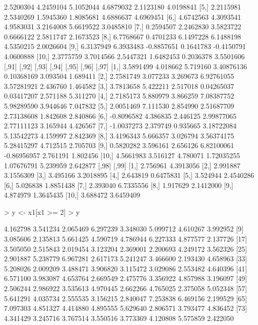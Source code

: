 \documentclass[12pt]{article}
\begin{document}
\begin{Schunk}
\begin{Soutput}
 [4,]  2.5200304 4.2459104  5.1052044 4.6879032  2.1123180  4.0198841
 [5,]  2.2115981 2.5340269  1.5945360 1.8085681  4.6886637  4.6969451
 [6,]  4.6742563 4.3093541  4.9583031 3.2164008  5.6619522  3.0485810
 [7,]  0.2594507 2.2462830  3.5823722 0.6666122  2.5811747  2.1673523
 [8,]  6.7768667 0.4701233  6.1497228 6.1488198  4.5350215  2.0026604
 [9,]  6.3137949 6.3933483 -0.8857651 0.1641783 -0.4150791  4.0600888
[10,]  2.3775759 3.7014566  2.5447321 1.6482453  0.2036378  3.5501606
           [,91]    [,92]    [,93]      [,94]       [,95]    [,96]    [,97]
 [1,]  3.5891499 4.018662 5.719160 3.40876136  0.10368169 3.093504 1.689411
 [2,]  2.7581749 3.077233 3.269673 6.92761055  3.57281921 2.436760 1.464582
 [3,]  3.7813658 5.422211 2.517018 0.04265037  0.03417207 2.571188 5.311270
 [4,]  2.7185173 5.880979 3.866259 7.08387752  5.98289590 3.944646 7.047832
 [5,]  2.0051469 7.111530 2.854990 2.51687709  2.73138608 1.842608 2.840866
 [6,] -0.8096582 4.386835 2.446125 2.99877065  2.77111123 3.165944 4.426567
 [7,] -1.0037273 2.379749 0.935665 3.18722084  5.13542273 4.159997 2.842369
 [8,]  3.4196343 5.666357 3.026794 3.56374175  5.28415297 4.712515 2.705703
 [9,]  0.5820282 3.596161 2.656126 6.82100061 -0.86956957 2.761191 1.802456
[10,]  4.5661983 3.516127 4.780071 1.72035255  1.07676791 5.239959 2.642877
         [,98]     [,99]
 [1,] 2.756961 4.3913056
 [2,] 2.991887 3.1556309
 [3,] 3.495166 3.2018895
 [4,] 2.643819 0.6475831
 [5,] 3.524944 2.4540286
 [6,] 5.026838 1.8851438
 [7,] 2.393040 6.7335556
 [8,] 1.917629 2.1412000
 [9,] 4.874979 1.3645435
[10,] 3.688472 3.6459409
\end{Soutput}
\begin{Sinput}
> y <- x1[x1 >= 2] 
> y
\end{Sinput}
\begin{Soutput}
  [1] 4.162798 3.541234 2.065469 6.297239 3.348030 5.099712 4.610267 3.992952
  [9] 3.085606 2.135813 5.661425 4.590719 4.786944 6.227333 4.877577 2.137726
 [17] 3.505050 2.515843 2.019454 3.123204 2.369001 2.200693 4.249172 3.562326
 [25] 2.901887 5.238779 6.967281 2.617173 5.241247 3.466600 2.193430 4.658963
 [33] 5.208026 2.009209 3.488471 3.906820 3.115472 3.029086 2.553482 4.640396
 [41] 6.571100 3.983087 4.653764 2.669549 2.475776 3.356922 4.857988 3.196097
 [49] 2.506244 2.986922 3.535613 4.970445 2.662266 4.765025 2.375058 5.052348
 [57] 5.641291 4.035734 2.555535 3.156215 2.840047 7.253838 6.469156 2.199529
 [65] 7.097303 4.851327 4.414880 4.895555 5.629640 2.806571 3.793477 4.836452
 [73] 4.341429 3.245716 3.767514 3.550516 3.773369 4.120808 5.575859 2.422050

\end{Soutput}
\end{Schunk}
\end{document}
